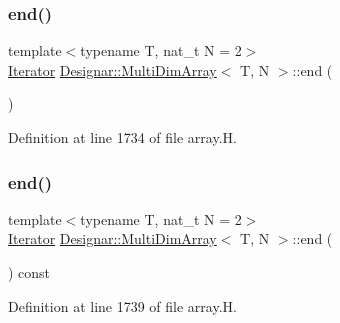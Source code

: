 \mbox{\label{class_designar_1_1_multi_dim_array_a6fc4ca23162a6b285f2a6fd698232459}} 
\subsubsection{\texorpdfstring{end()}{end()}\hspace{0.1cm}{\footnotesize\ttfamily [1/2]}}
{\footnotesize\ttfamily template$<$typename T, nat\+\_\+t N = 2$>$ \\
\hyperlink{class_designar_1_1_multi_dim_array_1_1_iterator}{Iterator} \hyperlink{class_designar_1_1_multi_dim_array}{Designar\+::\+Multi\+Dim\+Array}$<$ T, N $>$\+::end (\begin{DoxyParamCaption}{ }\end{DoxyParamCaption})\hspace{0.3cm}{\ttfamily [inline]}}



Definition at line 1734 of file array.\+H.

\mbox{\label{class_designar_1_1_multi_dim_array_a83200332e5914f2485d64cedb87b9470}} 
\subsubsection{\texorpdfstring{end()}{end()}\hspace{0.1cm}{\footnotesize\ttfamily [2/2]}}
{\footnotesize\ttfamily template$<$typename T, nat\+\_\+t N = 2$>$ \\
\hyperlink{class_designar_1_1_multi_dim_array_1_1_iterator}{Iterator} \hyperlink{class_designar_1_1_multi_dim_array}{Designar\+::\+Multi\+Dim\+Array}$<$ T, N $>$\+::end (\begin{DoxyParamCaption}{ }\end{DoxyParamCaption}) const\hspace{0.3cm}{\ttfamily [inline]}}



Definition at line 1739 of file array.\+H.

\mbox{\label{class_designar_1_1_multi_dim_array_a27a85daef556fb6cdb3f0c0b0d16e4d0}} 
